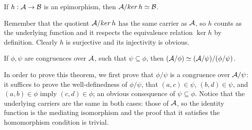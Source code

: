 \begin{theorem} If $h : \mathcal{A} \rightarrow \mathcal{B}$
is an epimorphism, then $\mathcal{A} /\! \mathop{ker} h \simeq \mathcal{B}$.
\end{theorem}
\noindent Remember that the quotient $\mathcal{A} /\! \mathop{ker} h$ has
the same carrier as $\mathcal{A}$, so $h$ counts as the underlying function
and it respects the equivalence relation $\mathop{ker} h$ by
definition. Clearly $h$ is surjective and its injectivity is obvious.

\begin{theorem} If $\phi,\psi$ are congruences over $\mathcal{A}$,
such that $\psi \subseteq \phi$, then $(\mathcal{A} / \phi) \simeq (\mathcal{A} / \psi)/(\phi / \psi)$. 
\end{theorem}

\noindent In order to prove this theorem, we first prove that
$\phi / \psi$ is a congruence over $\mathcal{A} / \psi$: it suffices to
prove the well-definedness of $\phi / \psi$, \ie that
$(a,c) \in \psi$, $(b,d) \in \psi$, and $(a,b) \in \phi$ imply
$(c,d) \in \phi$; an obvious consequence of $\psi \subseteq
\phi$. Notice that the underlying carriers are the same in both cases:
those of $\mathcal{A}$, so the identity function is the mediating
isomorphism and the proof that it satisfies the homomorphism condition
is trivial.

